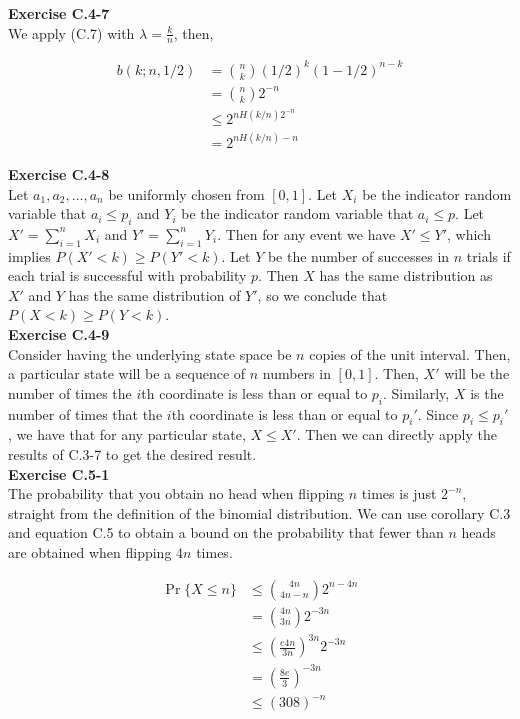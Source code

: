 \documentclass{article}
\begin{document}
\noindent\textbf{Exercise C.4-7}\\
We apply (C.7) with $\lambda = \frac{k}{n}$, then,

\begin{align*}
b(k;n,1/2) &= \binom{n}{k} (1/2)^k (1-1/2)^{n-k}\\
&= \binom{n}{k} 2^{-n}\\
&\le 2^{nH(k/n) 2^{-n}}\\
& = 2^{nH(k/n) - n}
\end{align*}

\noindent\textbf{Exercise C.4-8}\\

Let $a_1, a_2, \ldots, a_n$ be uniformly chosen from $[0,1]$. Let $X_i$ be the indicator random variable that $a_i \leq p_i$ and $Y_i$ be the indicator random variable that $a_i \leq p$.  Let $X' = \sum_{i=1}^n X_i$ and $Y'=\sum_{i=1}^nY_i$.  Then for any event we have $X' \leq Y'$, which implies $P(X' < k) \geq P(Y'<k)$.  Let $Y$ be the number of successes in $n$ trials if each trial is successful with probability $p$.  Then $X$ has the same distribution as $X'$ and $Y$ has the same distribution of $Y'$, so we conclude that $P(X<k) \geq P(Y<k)$. \\

\noindent\textbf{Exercise C.4-9}\\

Consider having the underlying state space be $n$ copies of the unit interval. Then, a particular state will be a sequence of $n$ numbers in $[0,1]$. Then, $X'$ will be the number of times the $i$th coordinate is less than or equal to $p_i$. Similarly, $X$ is the number of times that the $i$th coordinate is less than or equal to $p_i'$. Since $p_i \le p_i'$, we have that for any particular state, $X\le X'$. Then we can directly apply the results of C.3-7 to get the desired result.\\


\noindent\textbf{Exercise C.5-1}\\

The probability that you obtain no head when flipping $n$ times is just $2^{-n}$, straight from the definition of the binomial distribution. We can use corollary C.3 and equation C.5 to obtain a bound on the probability that fewer than $n$ heads are obtained when flipping $4n$ times. 

\begin{align*}
\Pr\{X \le n\} &\le \binom{4n}{4n-n}2^{n-4n}\\
& = \binom{4n}{3n}2^{-3n}\\
& \le \left(\frac{e4n}{3n}\right)^{3n} 2^{-3n}\\
& = \left(\frac{8e}{3}\right)^{-3n} \\
& \le (308)^{-n}
\end{align*}
\end{document}
